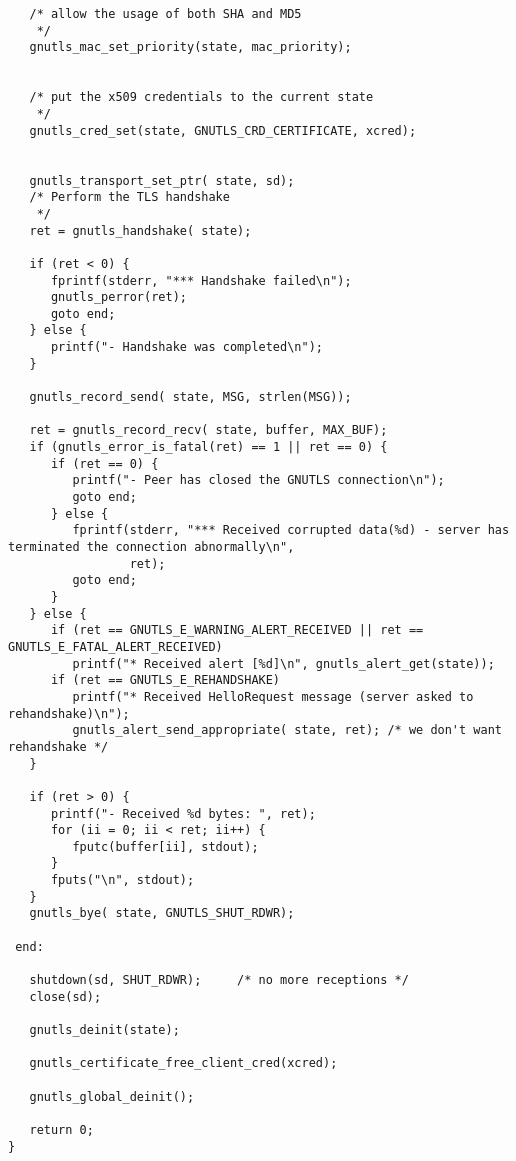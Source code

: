 \begin{verbatim}
   /* allow the usage of both SHA and MD5
    */
   gnutls_mac_set_priority(state, mac_priority);


   /* put the x509 credentials to the current state
    */
   gnutls_cred_set(state, GNUTLS_CRD_CERTIFICATE, xcred);


   gnutls_transport_set_ptr( state, sd);
   /* Perform the TLS handshake
    */
   ret = gnutls_handshake( state);

   if (ret < 0) {
      fprintf(stderr, "*** Handshake failed\n");
      gnutls_perror(ret);
      goto end;
   } else {
      printf("- Handshake was completed\n");
   }

   gnutls_record_send( state, MSG, strlen(MSG));

   ret = gnutls_record_recv( state, buffer, MAX_BUF);
   if (gnutls_error_is_fatal(ret) == 1 || ret == 0) {
      if (ret == 0) {
         printf("- Peer has closed the GNUTLS connection\n");
         goto end;
      } else {
         fprintf(stderr, "*** Received corrupted data(%d) - server has terminated the connection abnormally\n",
                 ret);
         goto end;
      }
   } else {
      if (ret == GNUTLS_E_WARNING_ALERT_RECEIVED || ret == GNUTLS_E_FATAL_ALERT_RECEIVED)
         printf("* Received alert [%d]\n", gnutls_alert_get(state));
      if (ret == GNUTLS_E_REHANDSHAKE)
         printf("* Received HelloRequest message (server asked to rehandshake)\n");
         gnutls_alert_send_appropriate( state, ret); /* we don't want rehandshake */
   }

   if (ret > 0) {
      printf("- Received %d bytes: ", ret);
      for (ii = 0; ii < ret; ii++) {
         fputc(buffer[ii], stdout);
      }
      fputs("\n", stdout);
   }
   gnutls_bye( state, GNUTLS_SHUT_RDWR);

 end:

   shutdown(sd, SHUT_RDWR);     /* no more receptions */
   close(sd);

   gnutls_deinit(state);

   gnutls_certificate_free_client_cred(xcred);

   gnutls_global_deinit();

   return 0;
}

\end{verbatim}
